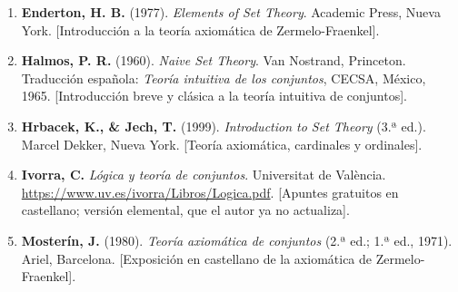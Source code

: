 \begin{enumerate}
    \item \textbf{Enderton, H. B.} (1977). \emph{Elements of Set Theory}. Academic Press, Nueva York. [Introducción a la teoría axiomática de Zermelo-Fraenkel].
    \item \textbf{Halmos, P. R.} (1960). \emph{Naive Set Theory}. Van Nostrand, Princeton. Traducción española: \emph{Teoría intuitiva de los conjuntos}, CECSA, México, 1965. [Introducción breve y clásica a la teoría intuitiva de conjuntos].
    \item \textbf{Hrbacek, K., \& Jech, T.} (1999). \emph{Introduction to Set Theory} (3.ª ed.). Marcel Dekker, Nueva York. [Teoría axiomática, cardinales y ordinales].
    \item \textbf{Ivorra, C.} \emph{Lógica y teoría de conjuntos}. Universitat de València. \url{https://www.uv.es/ivorra/Libros/Logica.pdf}. [Apuntes gratuitos en castellano; versión elemental, que el autor ya no actualiza].
    \item \textbf{Mosterín, J.} (1980). \emph{Teoría axiomática de conjuntos} (2.ª ed.; 1.ª ed., 1971). Ariel, Barcelona. [Exposición en castellano de la axiomática de Zermelo-Fraenkel].
\end{enumerate}

